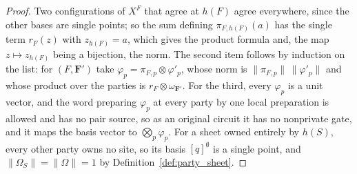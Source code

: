 \begin{proof}\leanok
    Two configurations of $X^F$ that agree at $h(F)$ agree everywhere, since the other bases are
    single points; so the sum defining $\pi_{F,h(F)}(a)$ has the single term $r_F(z)$ with
    $z_{h(F)}=a$, which gives the product formula and, the map $z\mapsto z_{h(F)}$ being a
    bijection, the norm. The second item follows by induction on the list: for $(F,\mathbf F')$
    take $\varphi_p=\pi_{F,p}\otimes\varphi'_p$, whose norm is
    $\lVert\pi_{F,p}\rVert\,\lVert\varphi'_p\rVert$ and whose product over the parties is
    $r_F\otimes\omega_{\mathbf F'}$. For the third, every $\varphi_p$ is a unit vector, and the
    word preparing $\varphi_p$ at every party by one local preparation is allowed and has no
    pair source, so as an original circuit it has no nonprivate gate, and it maps the basis
    vector to $\bigotimes_p\varphi_p$. For a sheet owned entirely by $h(S)$, every other party owns
    no site, so its basis $[q]^\emptyset$ is a single point, and
    $\lVert\Omega_S\rVert=\lVert\Omega\rVert=1$ by Definition~\ref{def:party_sheet}.
\end{proof}

